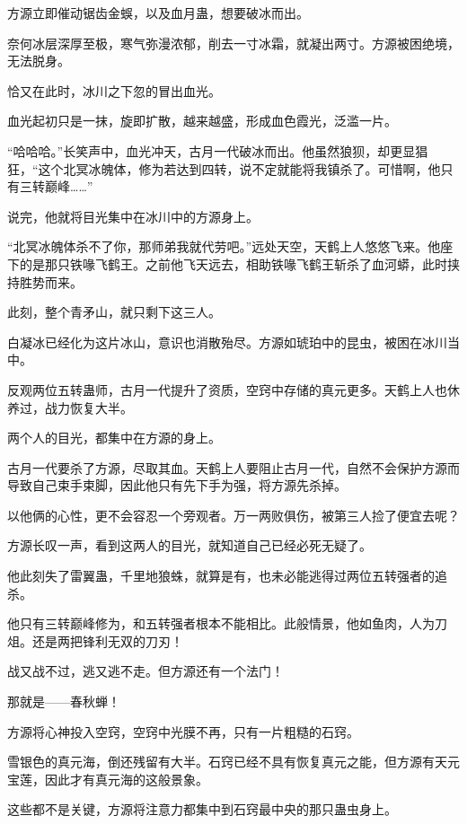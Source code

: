 
\begin{this_body}

方源立即催动锯齿金蜈，以及血月蛊，想要破冰而出。

奈何冰层深厚至极，寒气弥漫浓郁，削去一寸冰霜，就凝出两寸。方源被困绝境，无法脱身。

恰又在此时，冰川之下忽的冒出血光。

血光起初只是一抹，旋即扩散，越来越盛，形成血色霞光，泛滥一片。

“哈哈哈。”长笑声中，血光冲天，古月一代破冰而出。他虽然狼狈，却更显猖狂，“这个北冥冰魄体，修为若达到四转，说不定就能将我镇杀了。可惜啊，他只有三转巅峰……”

说完，他就将目光集中在冰川中的方源身上。

“北冥冰魄体杀不了你，那师弟我就代劳吧。”远处天空，天鹤上人悠悠飞来。他座下的是那只铁喙飞鹤王。之前他飞天远去，相助铁喙飞鹤王斩杀了血河蟒，此时挟持胜势而来。

此刻，整个青矛山，就只剩下这三人。

白凝冰已经化为这片冰山，意识也消散殆尽。方源如琥珀中的昆虫，被困在冰川当中。

反观两位五转蛊师，古月一代提升了资质，空窍中存储的真元更多。天鹤上人也休养过，战力恢复大半。

两个人的目光，都集中在方源的身上。

古月一代要杀了方源，尽取其血。天鹤上人要阻止古月一代，自然不会保护方源而导致自己束手束脚，因此他只有先下手为强，将方源先杀掉。

以他俩的心性，更不会容忍一个旁观者。万一两败俱伤，被第三人捡了便宜去呢？

方源长叹一声，看到这两人的目光，就知道自己已经必死无疑了。

他此刻失了雷翼蛊，千里地狼蛛，就算是有，也未必能逃得过两位五转强者的追杀。

他只有三转巅峰修为，和五转强者根本不能相比。此般情景，他如鱼肉，人为刀俎。还是两把锋利无双的刀刃！

战又战不过，逃又逃不走。但方源还有一个法门！

那就是——春秋蝉！

方源将心神投入空窍，空窍中光膜不再，只有一片粗糙的石窍。

雪银色的真元海，倒还残留有大半。石窍已经不具有恢复真元之能，但方源有天元宝莲，因此才有真元海的这般景象。

这些都不是关键，方源将注意力都集中到石窍最中央的那只蛊虫身上。


\end{this_body}
